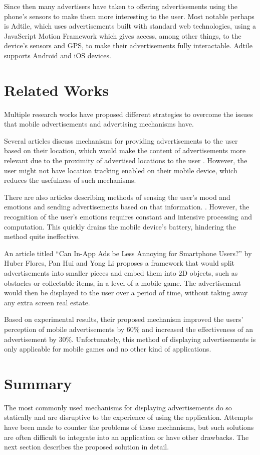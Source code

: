 Since then many advertisers have taken to offering advertisements using the phone’s sensors to make them more interesting to the user. Most notable perhaps is Adtile, which uses advertisements built with standard web technologies, using a JavaScript Motion Framework which gives access, among other things, to the device’s sensors and GPS, to make their advertisements fully interactable. Adtile supports Android and iOS devices. \cite{adtile}

\section{Related Works}

Multiple research works have proposed different strategies to overcome the issues that mobile advertisements and advertising mechanisms have.

Several articles discuss mechanisms for providing advertisements to the user based on their location, which would make the content of advertisements more relevant due to the proximity of advertised locations to the user \cite{hristova2004adme}\cite{aalto2004btandwap}. However, the user might not have location tracking enabled on their mobile device, which reduces the usefulness of such mechanisms.

There are also articles describing methods of sensing the user's mood and emotions and sending advertisements based on that information.  \cite{hristova2004adme}\cite{likamwa2013moodscope}. However, the recognition of the user's emotions requires constant and intensive processing and computation. This quickly drains the mobile device's battery, hindering the method quite ineffective.

An article titled “Can In-App Ads be Less Annoying for Smartphone Users?” by Huber Flores, Pan Hui and Yong Li proposes a framework that would split advertisements into smaller pieces and embed them into 2D objects, such as obstacles or collectable items, in a level of a mobile game. The advertisement would then be displayed to the user over a period of time, without taking away any extra screen real estate. 

Based on experimental results, their proposed mechanism improved the users' perception of mobile advertisements by 60\% and increased the effectiveness of an advertisement by 30\%.\cite{gesture-ads} Unfortunately, this method of displaying advertisements is only applicable for mobile games and no other kind of applications.

\section{Summary}

The most commonly used mechanisms for displaying advertisements do so statically and are disruptive to the experience of using the application. Attempts have been made to counter the problems of these mechanisms, but such solutions are often difficult to integrate into an application or have other drawbacks. The next section describes the proposed solution in detail.